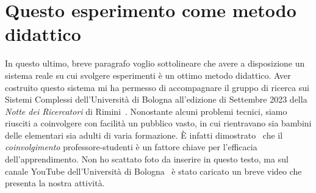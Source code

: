 \section{Questo esperimento come metodo didattico}
In questo ultimo, breve paragrafo voglio sottolineare che avere a disposizione
un sistema reale su cui svolgere esperimenti è un ottimo metodo didattico.
Aver costruito questo sistema mi ha permesso di
accompagnare il gruppo di ricerca sui Sistemi Complessi dell'Università di Bologna
all'edizione di Settembre 2023 della \emph{Notte dei Ricercatori} di Rimini~\cite{notteRicercator}.
Nonostante alcuni problemi tecnici\footnotemark, siamo riusciti a coinvolgere con facilità un pubblico
vasto, in cui rientravano sia bambini delle elementari sia adulti di
varia formazione.
È infatti dimostrato~\cite{Hake_1998} che il \emph{coinvolgimento} professore-studenti
è un fattore chiave per l'efficacia dell'apprendimento.
Non ho scattato foto da inserire in questo testo,
ma sul canale YouTube dell'Università di Bologna~\cite{youtube} è stato caricato un breve
video che presenta la nostra attività.


